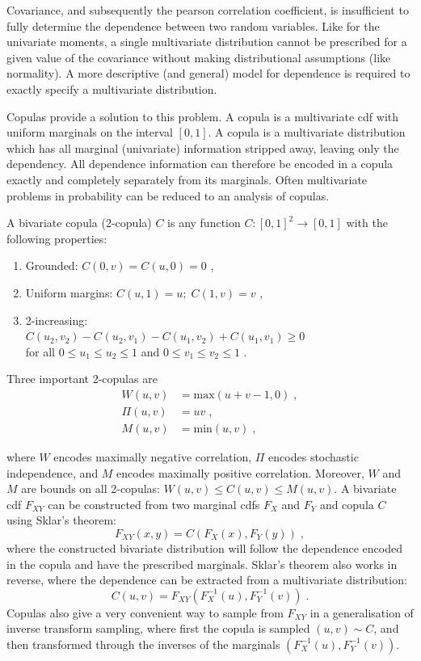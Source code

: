 \documentclass{juliacon}
\begin{document}
Covariance, and subsequently the pearson correlation coefficient, is insufficient to fully determine the dependence between two random variables. Like for the univariate moments, a single multivariate distribution cannot be prescribed for a given value of the covariance without making distributional assumptions (like normality). A more descriptive (and general) model for dependence is required to exactly specify a multivariate distribution.

Copulas \cite{nelsen2007introduction} provide a solution to this problem. A copula is a multivariate cdf with uniform marginals on the interval $[0, 1]$. A copula is a multivariate distribution which has all marginal (univariate) information stripped away, leaving only the dependency. All dependence information can therefore be encoded in a copula exactly and completely separately from its marginals. Often multivariate problems in probability can be reduced to an analysis of copulas.

A bivariate copula (2-copula) $C$ is any function $C:[0,1]^2 \rightarrow [0,  1]$ with the following properties:
\begin{enumerate}
  \item Grounded: $C(0,v) = C(u,0) = 0$ ,
  \item Uniform margins: $C(u,1) = u; \;C(1,v) = v$ ,
  \item 2-increasing: \\ $C(u_{2},v_{2}) - C_{}(u_{2}, v_{1}) - C(u_{1}, v_{2}) + C(u_{1}, v_{1}) \ge 0$\\ for all $0 \le u_{1} \le u_{2} \le 1$ and $0 \le v_{1} \le v_{2} \le 1$ .
\end{enumerate}
\noindent Three important 2-copulas are
\begin{align*}
  W(u,v) &= \mathrm{max}( u + v-1,0)\;,  \\
  \Pi(u,v) &= uv \;, \\
  M(u,v) &= \mathrm{min}(u,v) \;,
\end{align*}

\noindent where $W$ encodes maximally negative correlation, $\Pi$ encodes stochastic independence, and $M$ encodes maximally positive correlation. Moreover, $W$ and $M$ are bounds on all 2-copulas: $W(u,v) \leq C(u,v) \leq M(u,v)$. A bivariate cdf $F_{XY}$ can be constructed from two marginal cdfs $F_{X}$ and $F_{Y}$ and copula $C$ using Sklar's theorem:
\begin{equation*}
  F_{XY}(x,y) = C(F_{X}(x), F_{Y}(y)) \;,
\end{equation*}
\noindent where the constructed bivariate distribution will follow the dependence encoded in the copula and have the prescribed marginals. Sklar's theorem also works in reverse, where the dependence can be extracted from a multivariate distribution: 
\begin{equation*}
  C(u,v) = F_{XY}(F^{-1}_{X}(u), F^{-1}_{Y}(v)) \;.
\end{equation*}
\noindent Copulas also give a very convenient way to sample from $F_{XY}$ in a generalisation of inverse transform sampling, where first the copula is sampled $(u,v) \sim C$, and then transformed through the inverses of the marginals $(F^{-1}_{X}(u), F^{-1}_{Y}(v))$.
\end{document}
